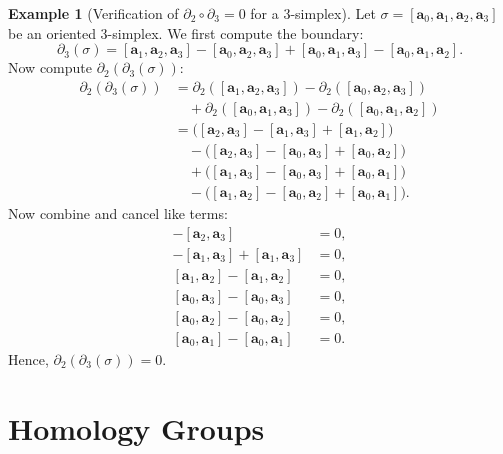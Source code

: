 \documentclass[12pt,oneside,reqno]{amsart}
\theoremstyle{plain}
\theoremstyle{definition}
\newtheorem{example}{Example}[section]
\theoremstyle{remark}
\newcommand{\0}{{\textbf{0}}}
\begin{document}
\begin{example}[Verification of $\partial_2 \circ \partial_3 = 0$ for a 3-simplex]\label{eq:Verification of Lemma for successive boundary operators}
Let $\sigma = [\mathbf{a}_0, \mathbf{a}_1, \mathbf{a}_2, \mathbf{a}_3]$ be an oriented 3-simplex. We first compute the boundary:
\[
\partial_3(\sigma) = 
[\mathbf{a}_1, \mathbf{a}_2, \mathbf{a}_3] 
- [\mathbf{a}_0, \mathbf{a}_2, \mathbf{a}_3] 
+ [\mathbf{a}_0, \mathbf{a}_1, \mathbf{a}_3] 
- [\mathbf{a}_0, \mathbf{a}_1, \mathbf{a}_2].
\]
Now compute $\partial_2(\partial_3(\sigma))$:
\begin{align*}
\partial_2(\partial_3(\sigma)) 
&= \partial_2([\mathbf{a}_1, \mathbf{a}_2, \mathbf{a}_3]) 
- \partial_2([\mathbf{a}_0, \mathbf{a}_2, \mathbf{a}_3]) \\
&\quad + \partial_2([\mathbf{a}_0, \mathbf{a}_1, \mathbf{a}_3]) 
- \partial_2([\mathbf{a}_0, \mathbf{a}_1, \mathbf{a}_2]) \\
&= \big( [\mathbf{a}_2, \mathbf{a}_3] - [\mathbf{a}_1, \mathbf{a}_3] + [\mathbf{a}_1, \mathbf{a}_2] \big) \\
&\quad - \big( [\mathbf{a}_2, \mathbf{a}_3] - [\mathbf{a}_0, \mathbf{a}_3] + [\mathbf{a}_0, \mathbf{a}_2] \big) \\
&\quad + \big( [\mathbf{a}_1, \mathbf{a}_3] - [\mathbf{a}_0, \mathbf{a}_3] + [\mathbf{a}_0, \mathbf{a}_1] \big) \\
&\quad - \big( [\mathbf{a}_1, \mathbf{a}_2] - [\mathbf{a}_0, \mathbf{a}_2] + [\mathbf{a}_0, \mathbf{a}_1] \big).
\end{align*}
Now combine and cancel like terms:
\begin{align*}
[\mathbf{a}_2, \mathbf{a}_3] - [\mathbf{a}_2, \mathbf{a}_3] &= 0, \\
-[\mathbf{a}_1, \mathbf{a}_3] + [\mathbf{a}_1, \mathbf{a}_3] &= 0, \\
[\mathbf{a}_1, \mathbf{a}_2] - [\mathbf{a}_1, \mathbf{a}_2] &= 0, \\
[\mathbf{a}_0, \mathbf{a}_3] - [\mathbf{a}_0, \mathbf{a}_3] &= 0, \\
[\mathbf{a}_0, \mathbf{a}_2] - [\mathbf{a}_0, \mathbf{a}_2] &= 0, \\
[\mathbf{a}_0, \mathbf{a}_1] - [\mathbf{a}_0, \mathbf{a}_1] &= 0.
\end{align*}
Hence, $\partial_2(\partial_3(\sigma)) = 0$.
\end{example}

\section{Homology Groups}\label{s:Homology Groups}
\end{document}
